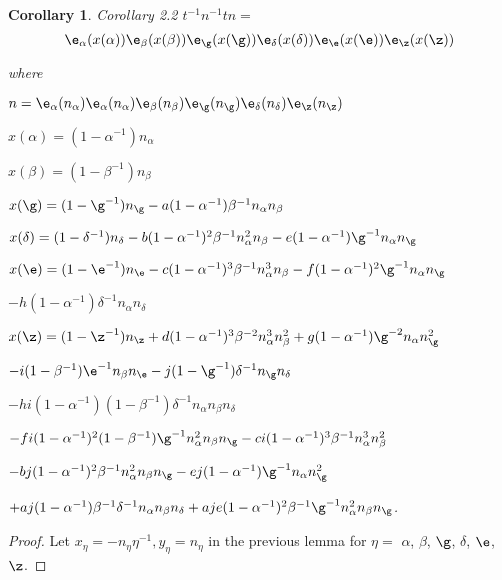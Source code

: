 \documentclass{memo-l}
\newtheorem{corollary}[theorem]{Corollary}
\theoremstyle{definition}
\theoremstyle{remark}
\numberwithin{section}{chapter}
\numberwithin{equation}{chapter}
\begin{document}
\begin{corollary}{Corollary 2.2}   $t^{-1}n^{-1}tn =$
$${\e}_{\alpha}(x({\alpha})){\e}_{\beta}(x({\beta}))
{\e}_{{\g}}(x({\g})){\e}_{{\delta}}(x({\delta}))
{\e}_{{\e}}(x({\e})){\e}_{{\z}}(x({\z}))$$

\noindent
where 

$n = {\e}_{\alpha}(n_{\alpha}){\e}_{\alpha}
(n_{\alpha}){\e}_{\beta}(n_{\beta}){\e}_{{\g}}
(n_{{\g}}){\e}_{{\delta}}(n_{{\delta}}){\e}_{{\z}}
(n_{{\z}})$

$x({\alpha}) = (1-{\alpha}^{-1})n_{\alpha}$

$x({\beta}) = (1-{\beta}^{-1})n_{\beta}$

$x({\g}) = (1-{\g}^{-1})n_{{\g}} -a(1-{\alpha}^{-1}){\beta}^{-1}
n_{\alpha}n_{\beta}$

$x({\delta}) = (1-{\delta}^{-1})n_{{\delta}} -b(1-{\alpha}^{-1})^{2}
{\beta}^{-1}n_{\alpha}^{2}n_{\beta} -e(1-{\alpha}^{-1}){\g}^{-1}
n_{\alpha}n_{{\g}}$

$x({\e}) = (1-{\e}^{-1})n_{{\e}} -c(1-{\alpha}^{-1})^{3}
{\beta}^{-1}n_{\alpha}^{3}n_{\beta} -f(1-{\alpha}^{-1})^{2}{\g}^{-1}
n_{\alpha}n_{{\g}}$

\quad     $-h(1-{\alpha}^{-1}){\delta}^{-1}n_{\alpha}n_{{\delta}}$

        
$x({\z}) = (1-{\z}^{-1})n_{{\z}} + d(1-{\alpha}^{-1})^{3}{\beta}^{-2}
n_{\alpha}^{3}n_{\beta}^{2} + g(1-{\alpha}^{-1}){\g}^{-2}n_{\alpha}
n_{{\g}}^{2}$


\quad    $-i(1-{\beta}^{-1}){\e}^{-1}n_{\beta}n_{{\e}} - 
j(1-{\g}^{-1}){\delta}^{-1}n_{{\g}}n_{{\delta}}$

\quad  $-hi(1-{\alpha}^{-1})(1-{\beta}^{-1}){\delta}^{-1}n_{\alpha}n_{\beta}
n_{{\delta}}$

\quad   $-fi(1-{\alpha}^{-1})^{2}(1-{\beta}^{-1}){\g}^{-1}n_{\alpha}^{2}
n_{\beta}n_{{\g}} -ci(1-{\alpha}^{-1})^{3}{\beta}^{-1}n_{\alpha}^{3}
n_{\beta}^{2}$

\quad    $-bj(1-{\alpha}^{-1})^{2}{\beta}^{-1}n_{\alpha}^{2}n_{\beta}
n_{{\g}} -ej(1-{\alpha}^{-1}){\g}^{-1}n_{\alpha}n_{{\g}}^{2}$

\quad    $+aj(1-{\alpha}^{-1}){\beta}^{-1}{\delta}^{-1}n_{\alpha}n_{\beta}
n_{{\delta}} +aje(1-{\alpha}^{-1})^{2}{\beta}^{-1}{\g}^{-1}n_{\alpha}^{2}
n_{\beta}n_{{\g}}$. 
\end{corollary}

\begin{proof}    Let $x_{{\eta}} = -n_{{\eta}}{\eta}^{-1}, y_{{\eta}} = 
n_{{\eta}}$ in the previous lemma for ${\eta} =$ 
${\alpha}$, ${\beta}$, ${\g}$, ${\delta}$, ${\e}$, ${\z}$.
\end{proof} 
\end{document}

